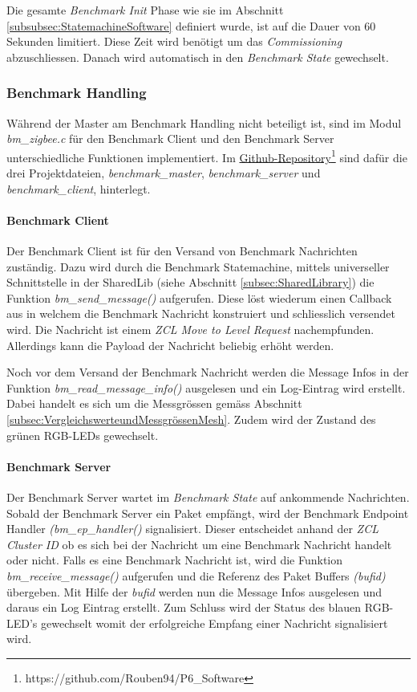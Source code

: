 Die gesamte \textit{Benchmark Init} Phase wie sie im Abschnitt \ref{subsubsec:StatemachineSoftware} definiert wurde, ist auf die Dauer von 60 Sekunden limitiert.
Diese Zeit wird benötigt um das \textit{Commissioning} abzuschliessen.
Danach wird automatisch in den \textit{Benchmark State} gewechselt.

\subsubsection{Benchmark Handling}\label{subsubsec:ZigbeeBenchmarkHandling}
Während der Master am Benchmark Handling nicht beteiligt ist,  sind im Modul \textit{bm\_zigbee.c} für den Benchmark Client und den Benchmark Server unterschiedliche Funktionen implementiert.
Im \href{https://github.com/Rouben94/P6_Software}{Github-Repository\footnote{\url{https://github.com/Rouben94/P6_Software}\cite{anklin_bobst_horath_rouben94p6_software_nodate}}} sind dafür die drei Projektdateien, \textit{benchmark\_master}, \textit{benchmark\_server} und \textit{benchmark\_client}, hinterlegt.

\paragraph{Benchmark Client}
Der Benchmark Client ist für den Versand von Benchmark Nachrichten zuständig.
Dazu wird durch die Benchmark Statemachine, mittels universeller Schnittstelle in der SharedLib (siehe Abschnitt \ref{subsec:SharedLibrary}) die Funktion \textit{bm\_send\_message()} aufgerufen.
Diese löst wiederum einen Callback aus in welchem die Benchmark Nachricht konstruiert und schliesslich versendet wird.
Die Nachricht ist einem \textit{ZCL Move to Level Request} nachempfunden.
Allerdings kann die Payload der Nachricht beliebig erhöht werden.

Noch vor dem Versand der Benchmark Nachricht werden die Message Infos in der Funktion \textit{bm\_read\_message\_info()} ausgelesen und ein Log-Eintrag wird erstellt.
Dabei handelt es sich um die Messgrössen gemäss Abschnitt \ref{subsec:VergleichswerteundMessgrössenMesh}.
Zudem wird der Zustand des grünen RGB-LEDs gewechselt.

\paragraph{Benchmark Server}
Der Benchmark Server wartet im \textit{Benchmark State} auf ankommende Nachrichten.
Sobald der Benchmark Server ein Paket empfängt, wird der Benchmark Endpoint Handler \textit{(bm\_ep\_handler()} signalisiert.
Dieser entscheidet anhand der \textit{ZCL Cluster ID} ob es sich bei der Nachricht um eine Benchmark Nachricht handelt oder nicht.
Falls es eine Benchmark Nachricht ist, wird die Funktion \textit{bm\_receive\_message()} aufgerufen und die Referenz des Paket Buffers \textit{(bufid)} übergeben.
Mit Hilfe der \textit{bufid} werden nun die Message Infos ausgelesen und daraus ein Log Eintrag erstellt.
Zum Schluss wird der Status des blauen RGB-LED's gewechselt womit der erfolgreiche Empfang einer Nachricht signalisiert wird.




